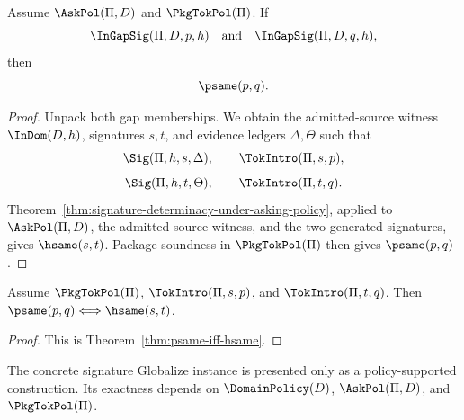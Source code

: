 \begin{theorem}
\label{thm:gap-separation-policy}
Assume $\AskPol(\Pi,D)$ and $\PkgTokPol(\Pi)$. If
$$
  \InGapSig(\Pi,D,p,h)
  \quad\text{and}\quad
  \InGapSig(\Pi,D,q,h),
$$
then
$$
  \psame(p,q).
$$
\end{theorem}

\begin{proof}
Unpack both gap memberships. We obtain the admitted-source witness $\InDom(D,h)$, signatures $s,t$, and evidence ledgers $\Delta,\Theta$ such that
$$
  \Sig(\Pi,h,s,\Delta),\qquad \TokIntro(\Pi,s,p),
$$
$$
  \Sig(\Pi,h,t,\Theta),\qquad \TokIntro(\Pi,t,q).
$$
Theorem~\ref{thm:signature-determinacy-under-asking-policy}, applied to $\AskPol(\Pi,D)$, the admitted-source witness, and the two generated signatures, gives $\hsame(s,t)$. Package soundness in $\PkgTokPol(\Pi)$ then gives $\psame(p,q)$.
\end{proof}

\begin{theorem}
\label{thm:globalize-exact}
Assume $\PkgTokPol(\Pi)$, $\TokIntro(\Pi,s,p)$, and $\TokIntro(\Pi,t,q)$. Then $\psame(p,q)\Longleftrightarrow\hsame(s,t)$.
\end{theorem}

\begin{proof}
This is Theorem~\ref{thm:psame-iff-hsame}.
\end{proof}

\begin{corollary}
\label{cor:active-reading}
The concrete signature Globalize instance is presented only as a policy-supported construction. Its exactness depends on \(\DomainPolicy(D)\), \(\AskPol(\Pi,D)\), and \(\PkgTokPol(\Pi)\).
\end{corollary}

